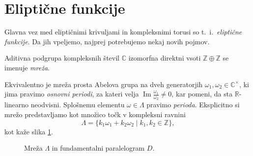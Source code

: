 \documentclass[mat1]{fmfdelo}
\numberwithin{equation}{section}
\newcommand{\R}{\mathbb R}
\newcommand{\Z}{\mathbb Z}
\newcommand{\C}{\mathbb C}
\newcommand{\CM}{\mathbb C ^\times}
\renewcommand\Im{\operatorname{Im}}%
\theoremstyle{definition}
\begin{document}
\section{Eliptične funkcije} \label{elipticne funkcije}

Glavna vez med eliptičnimi krivuljami in kompleksnimi torusi so t.~i.\ \emph{eliptične funkcije}. Da jih vpeljemo, najprej potrebujemo nekaj novih pojmov.

\begin{definicija}
    Aditivna podgrupa kompleksnih števil $\C$ izomorfna direktni vsoti $\Z \oplus \Z$ se imenuje \emph{mreža}. 
\end{definicija}
    
Ekvivalentno je mreža prosta Abelova grupa na dveh generatorjih $\omega_1, \omega_2 \in \CM$, ki jima pravimo \emph{osnovni periodi}, za kateri velja $\Im \frac{\omega_1}{\omega_2} \neq 0$, kar pomeni, da sta $\R$-linearno neodvisni. Splošnemu elementu $\omega \in \Lambda$ pravimo \emph{perioda}. Eksplicitno si mrežo predstavljamo kot množico točk v kompleksni ravnini
\[
    \Lambda = \{k_1 \omega_1 + k_2 \omega_2 \mid k_1, k_2 \in \Z\},  
\]
kot kaže slika \ref{mreza}.
\\

\begin{figure}[H]
    \centering

    \caption{Mreža $\Lambda$ in fundamentalni paralelogram $D$.}
    \label{mreza}
\end{figure}
\end{document}
